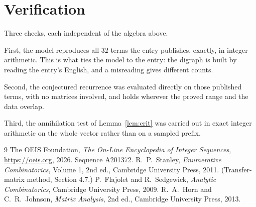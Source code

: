 \documentclass[11pt,a4paper]{article}
\theoremstyle{plain}
\theoremstyle{definition}
\begin{document}
\section{Verification}

Three checks, each independent of the algebra above.

First, the model reproduces all $32$ terms the entry publishes, exactly, in integer
arithmetic. This is what ties the model to the entry: the digraph is built by reading the
entry's English, and a misreading gives different counts.

Second, the conjectured recurrence was evaluated directly on those published terms, with no
matrices involved, and holds wherever the proved range and the data overlap.

Third, the annihilation test of Lemma~\ref{lem:crit} was carried out in exact integer
arithmetic on the whole vector rather than on a sampled prefix.

\begin{thebibliography}{9}
 The OEIS Foundation, \emph{The On-Line Encyclopedia of Integer
Sequences}, \url{https://oeis.org}, 2026. Sequence A201372.
 R.~P.~Stanley, \emph{Enumerative Combinatorics}, Volume 1, 2nd ed.,
Cambridge University Press, 2011. (Transfer-matrix method, Section 4.7.)
 P.~Flajolet and R.~Sedgewick, \emph{Analytic Combinatorics}, Cambridge
University Press, 2009.
 R.~A.~Horn and C.~R.~Johnson, \emph{Matrix Analysis}, 2nd ed., Cambridge
University Press, 2013.
\end{thebibliography}
\end{document}
